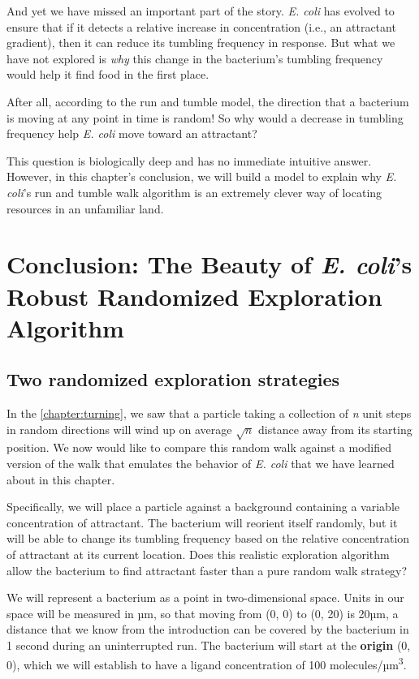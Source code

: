 And yet we have missed an important part of the story. \textit{E. coli} has evolved to ensure that if it detects a relative increase in concentration (i.e., an attractant gradient), then it can reduce its tumbling frequency in response. But what we have not explored is \textit{why} this change in the bacterium's tumbling frequency would help it find food in the first place.

After all, according to the run and tumble model, the direction that a bacterium is moving at any point in time is random! So why would a decrease in tumbling frequency help \textit{E. coli} move toward an attractant?

This question is biologically deep and has no immediate intuitive answer. However, in this chapter's conclusion, we will build a model to explain why \textit{E. coli}'s run and tumble walk algorithm is an extremely clever way of locating resources in an unfamiliar land.


\FloatBarrier
{}

\section{Conclusion: The Beauty of \textit{E. coli}'s Robust Randomized Exploration Algorithm}
\label{sec:conclusion}

\subsection{Two randomized exploration strategies}


In the \autoref{chapter:turning}, we saw that a particle taking a collection of \textit{n} unit steps in random directions will wind up on average $\sqrt{n}$ distance away from its starting position. We now would like to compare this random walk against a modified version of the walk that emulates the behavior of \textit{E. coli} that we have learned about in this chapter.

Specifically, we will place a particle against a background containing a variable concentration of attractant. The bacterium will reorient itself randomly, but it will be able to change its tumbling frequency based on the relative concentration of attractant at its current location. Does this realistic exploration algorithm allow the bacterium to find attractant faster than a pure random walk strategy?

We will represent a bacterium as a point in two-dimensional space. Units in our space will be measured in µm, so that moving from (0, 0) to (0, 20) is 20µm, a distance that we know from the introduction can be covered by the bacterium in 1 second during an uninterrupted run. The bacterium will start at the \textbf{origin} (0, 0), which we will establish to have a ligand concentration of 100 molecules/µm\textsuperscript{3}.

